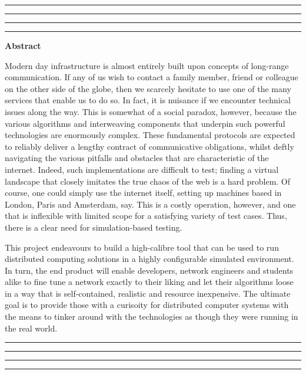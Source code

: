 \thispagestyle{empty}
\hrule\hrule\hrule\hrule %
\begin{center}
    \textbf{\large Abstract}
    \\
\end{center}

Modern day infrastructure is almost entirely built upon concepts of long-range communication. If any of us wish to
contact a family member, friend or colleague on the other side of the globe, then we scarcely hesitate to use one of
the many services that enable us to do so. In fact, it is nuisance if we encounter technical issues along the way. This
is somewhat of a social paradox, however, because the various algorithms and interweaving components that underpin
such powerful technologies are enormously complex. These fundamental protocols are expected to reliably deliver a
lengthy contract of communicative obligations, whilst deftly navigating the various pitfalls and obstacles that are
characteristic of the internet. Indeed, such implementations are difficult to test; finding a virtual landscape that
closely imitates the true chaos of the web is a hard problem. Of course, one could simply use the internet itself,
setting up machines based in London, Paris and Amsterdam, say. This is a costly operation, however, and one that is
inflexible with limited scope for a satisfying variety of test cases. Thus, there is a clear need for
simulation-based testing.

This project endeavours to build a high-calibre tool that can be used to run distributed computing solutions in a
highly configurable simulated environment. In turn, the end product will enable developers, network engineers and
students alike to fine tune a network exactly to their liking and let their algorithms loose in a way that is
self-contained, realistic and resource inexpensive. The ultimate goal is to provide those with a curisoity for
distributed computer systems with the means to tinker around with the technologies as though they were running in the
real world.


\vfill
\hrule\hrule\hrule\hrule
\clearpage
